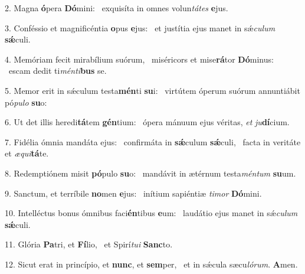 2. Magna \textbf{ó}pera \textbf{Dó}mini: \ast\  exquisíta in omnes volun\textit{tá}\textit{tes} \textbf{e}jus.\

3. Conféssio et magnificéntia \textbf{o}pus \textbf{e}jus: \ast\  et justítia ejus manet in sǽ\textit{cu}\textit{lum} \textbf{sǽ}culi.\

4. Memóriam fecit mirabílium suórum, \dag\  miséricors et mise\textbf{rá}tor \textbf{Dó}minus: \ast\  escam dedit ti\textit{mén}\textit{ti}\textbf{bus} se.\

5. Memor erit in sǽculum testa\textbf{mén}ti \textbf{su}i: \ast\  virtútem óperum suórum annuntiábit pó\textit{pu}\textit{lo} \textbf{su}o:\

6. Ut det illis heredi\textbf{tá}tem \textbf{gén}tium: \ast\  ópera mánuum ejus véritas, \textit{et} \textit{ju}\textbf{dí}cium.\

7. Fidélia ómnia mandáta ejus: \dag\  confirmáta in \textbf{sǽ}culum \textbf{sǽ}culi, \ast\  facta in veritáte et \textit{æ}\textit{qui}\textbf{tá}te.\

8. Redemptiónem misit \textbf{pó}pulo \textbf{su}o: \ast\  mandávit in ætérnum testa\textit{mén}\textit{tum} \textbf{su}um.\

9. Sanctum, et terríbile \textbf{no}men \textbf{e}jus: \ast\  inítium sapiéntiæ \textit{ti}\textit{mor} \textbf{Dó}mini.\

10. Intelléctus bonus ómnibus faci\textbf{én}tibus \textbf{e}um: \ast\  laudátio ejus manet in sǽ\textit{cu}\textit{lum} \textbf{sǽ}culi.\

11. Glória \textbf{Pa}tri, et \textbf{Fí}lio, \ast\  et Spirí\textit{tu}\textit{i} \textbf{Sanc}to.\

12. Sicut erat in princípio, et \textbf{nunc}, et \textbf{sem}per, \ast\  et in sǽcula sæcu\textit{ló}\textit{rum}. \textbf{A}men.\

